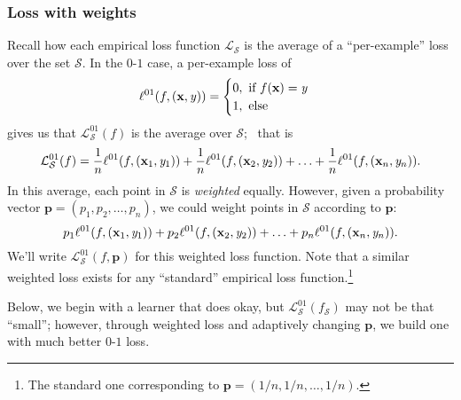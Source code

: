 \documentclass[smaller]{beamer}
\theoremstyle{example}
\newcommand{\x}{\textbf{x}}
\newcommand{\ix}[1]{{\it #1}}
\begin{document}
\begin{frame}
    \frametitle{Loss with weights}
    Recall how each empirical loss function $\mathcal L_{\mathcal S}$ is the average of a ``per-example'' loss over the set $\mathcal S$. In the $0$-$1$ case, a per-example loss of 
    \[\ell^{01}(f, (\x,\ix y)) = \begin{cases}0,\ \text{if }f(\x)=\ix y\\ 1,\ \text{else}\end{cases}\] 
    \vspace{-6pt}
    gives us that $\mathcal L_{\mathcal S}^{01}(f)$ is the average over $\mathcal S$; \pause\ that is 
        \[\mathcal L_{\mathcal S}^{01}(f) = \frac1{n}\ell^{01}(f, (\x_1,\ix y_1)) + \frac1{n}\ell^{01}(f, (\x_2,\ix y_2)) + \ldots + \frac1{n}\ell^{01}(f, (\x_n,\ix y_n)).\]
    \pause
    In this average, each point in $\mathcal S$ is \textit{weighted} equally. However, given a probability vector $\textbf{p} = (p_1,p_2,\ldots,p_n)$, we could weight points in $\mathcal S$ according to $\textbf{p}$: 
        \[p_1\ell^{01}(f, (\x_1,\ix y_1)) + p_2\ell^{01}(f, (\x_2,\ix y_2)) + \ldots + p_n\ell^{01}(f, (\x_n,\ix y_n)).\]
    \pause
    We'll write $\mathcal L_{\mathcal S}^{01}(f, \textbf{p})$ for this weighted loss function. Note that a similar weighted loss exists for any ``standard'' empirical loss function.\footnote{The standard one corresponding to $\textbf{p} = (1/n, 1/n,\ldots,1/n)$.}

    \pause
    Below, we begin with a learner that does okay, but $\mathcal L_{\mathcal S}^{01}(f_{\mathcal S})$ may not be that ``small''; however, through weighted loss and adaptively changing $\textbf{p}$, we build one with much better $0$-$1$ loss.
\end{frame}
\end{document}
